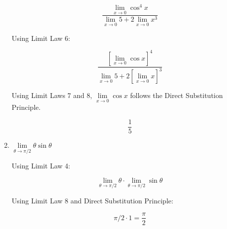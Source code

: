 \documentclass{article}
\begin{document}
\begin{enumerate}
			$$\frac{\lim\limits _{x \to 0} \cos ^4 x}{\lim \limits _{x \to 0} 5 + 2 \lim \limits _{x \to 0} x^3}$$
			
			Using Limit Law 6:
			
			$$\frac{[\lim \limits _{x \to 0} \cos x]^4}{\lim \limits _{x \to 0} 5 + 2 [\lim \limits _{x \to 0} x]^3}$$
			
			Using Limit Laws 7 and 8, $\lim \limits _{x \to 0} \cos x$ follows the Direct Substitution Principle.
			
			$$\frac{1}{5}$$
			
		\item $\lim \limits _{\theta \to \pi / 2} \theta \sin \theta$
		
			Using Limit Law 4:
			
			$$\lim \limits _{\theta \to \pi / 2} \theta \cdot \lim \limits _{\theta \to \pi / 2} \sin \theta$$
			
			Using Limit Law 8 and Direct Substitution Principle:
			
			$$\pi /2 \cdot 1= \frac{\pi}{2}$$
		
	\end{enumerate}
\end{document}
